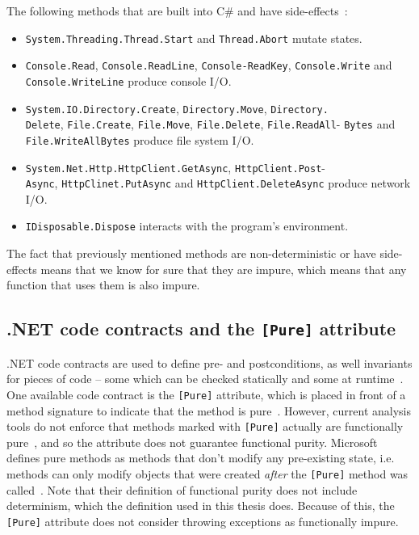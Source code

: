 \documentclass[a4paper,12pt]{article}
\begin{document}
The following methods that are built into C\# and have side-effects~\cite{dixin2015}:

\begin{itemize}
  \item \texttt{System.Threading.Thread.Start} and \texttt{Thread.Abort} mutate states.
  \item \texttt{Console.Read}, \texttt{Console.ReadLine}, \texttt{Console-ReadKey}, \texttt{Console.\allowbreak Write} and \texttt{Console.WriteLine} produce console I/O.
  \item \texttt{System.IO.Directory.Create}, \texttt{Directory.Move}, \texttt{Directory.}\\\texttt{Delete}, \texttt{File.Create}, \texttt{File.Move}, \texttt{File.Delete}, \texttt{File.ReadAll\allowbreak }- \texttt{Bytes} and \texttt{File.WriteAllBytes} produce file system I/O.
\item \texttt{System.Net.Http.HttpClient.GetAsync}, \texttt{HttpClient.Post}- \\\texttt{Async}, \texttt{HttpClinet.PutAsync} and \texttt{HttpClient.DeleteAsync} produce network I/O.
  \item \texttt{IDisposable.Dispose} interacts with the program's environment.
\end{itemize}

The fact that previously mentioned methods are non-deterministic or have side-effects means that we know for sure that they are impure, which means that any function that uses them is also impure.

\subsection{.NET code contracts and the \texttt{[Pure]} attribute} \label{sub:code-contracts}
.NET code contracts are used to define pre- and postconditions, as well invariants for pieces of code -- some which can be checked statically and some at runtime~\cite{microsoft-code-contracts}. One available code contract is the \texttt{[Pure]} attribute, which is placed in front of a method signature to indicate that the method is pure~\cite{microsoft-code-contracts}. However, current analysis tools do not enforce that methods marked with \texttt{[Pure]} actually are functionally pure~\cite{microsoft-pure-attribute}, and so the attribute does not guarantee functional purity. Microsoft defines pure methods as methods that don't modify any pre-existing state, i.e. methods can only modify objects that were created \textit{after} the \texttt{[Pure]} method was called~\cite{microsoft-code-contracts}. Note that their definition of functional purity does not include determinism, which the definition used in this thesis does. Because of this, the \texttt{[Pure]} attribute does not consider throwing exceptions as functionally impure.
\end{document}
